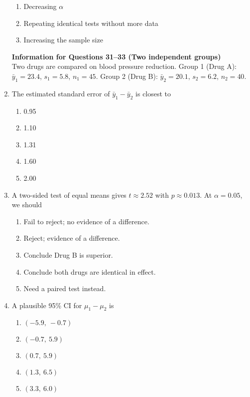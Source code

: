 \documentclass{article}
\begin{document}
\begin{enumerate}
\begin{enumerate}[label=\Alph*.]
        \item Decreasing $\alpha$
        \item Repeating identical tests without more data
        \item Increasing the sample size
    \end{enumerate}
\textbf{Information for Questions 31--33 (Two independent groups)}\\
Two drugs are compared on blood pressure reduction. Group 1 (Drug A): $\bar y_1=23.4$, $s_1=5.8$, $n_1=45$. Group 2 (Drug B): $\bar y_2=20.1$, $s_2=6.2$, $n_2=40$.
\item The estimated standard error of $\bar y_1-\bar y_2$ is closest to
    \begin{enumerate}[label=\Alph*.]
        \item 0.95
        \item 1.10
        \item 1.31
        \item 1.60
        \item 2.00
    \end{enumerate}
\item A two-sided test of equal means gives $t\approx 2.52$ with $p \approx 0.013$. At $\alpha=0.05$, we should
    \begin{enumerate}[label=\Alph*.]
        \item Fail to reject; no evidence of a difference.
        \item Reject; evidence of a difference.
        \item Conclude Drug B is superior.
        \item Conclude both drugs are identical in effect.
        \item Need a paired test instead.
    \end{enumerate}
\item A plausible 95\% CI for $\mu_1-\mu_2$ is
    \begin{enumerate}[label=\Alph*.]
        \item $(-5.9,\ -0.7)$
        \item $(-0.7,\ 5.9)$
        \item $(0.7,\ 5.9)$
        \item $(1.3,\ 6.5)$
        \item $(3.3,\ 6.0)$
    \end{enumerate}


\end{enumerate}
\end{document}
